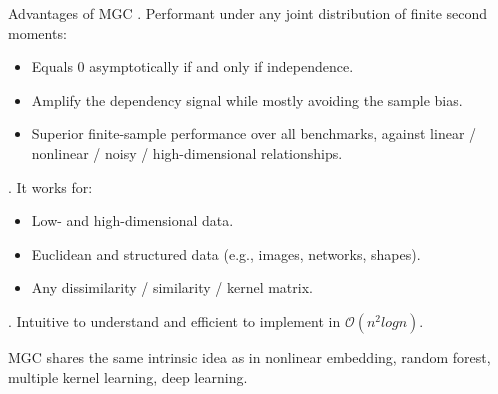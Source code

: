 \documentclass[mathserif,t]{beamer}
\newcommand{\blind}{0}
\newcommand{\Mgc}{MGC}
\begin{document}
\begin{frame}{Advantages of \Mgc}
. Performant under any joint distribution of finite second moments:
\pause
\begin{itemize}[<+->]
\item Equals $0$ asymptotically if and only if independence.
\item \textcolor{UniOrange}{Amplify the dependency signal while mostly avoiding the sample bias.} 
\item Superior finite-sample performance over all benchmarks, against linear / nonlinear / noisy / high-dimensional relationships. 
\end{itemize}

\pause
{}. It works for:
\pause
\begin{itemize}[<+->]
\item Low- and high-dimensional data.
\item Euclidean and structured data (e.g., images, networks, shapes).
\item Any dissimilarity / similarity / kernel matrix.
\end{itemize}

\pause
{}. Intuitive to understand and efficient to implement in $\mathcal{O}(n^2 log n)$.

\pause
\medskip
MGC shares the same intrinsic idea as in nonlinear embedding, random forest, multiple kernel learning, deep learning.
\end{frame}

\end{document}
